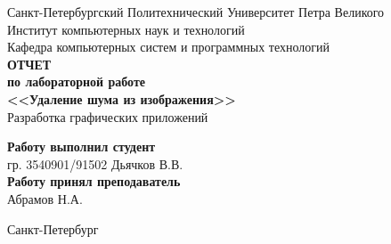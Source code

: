 \begin{titlepage}
\begin{center}
	Санкт-Петербургский Политехнический Университет Петра Великого\\[0.3cm]
	Институт компьютерных наук и технологий \\[0.3cm]
	Кафедра компьютерных систем и программных технологий\\[4cm]

	\textbf{ОТЧЕТ}\\
	\textbf{по лабораторной работе}\\[0.5cm]
	\textbf{<<Удаление шума из изображения>>}\\[0.1cm]
	Разработка графических приложений\\[3.0cm]
\end{center}

\begin{flushright}
	\begin{minipage}{0.5\textwidth}
		\textbf{Работу выполнил студент}\\[3mm]
		гр. 3540901/91502 \hfill \sign[1.1cm] \hfill Дьячков В.В.\\[5mm]
		\textbf{Работу принял преподаватель}\\[5mm]
		\sign[5cm] \hfill Абрамов Н.А. \\[5mm]
	\end{minipage}
\end{flushright}

\vfill

\begin{center}
	Санкт-Петербург\\[0.3cm]
	\the\year
\end{center}
\end{titlepage}

\addtocounter{page}{1}
